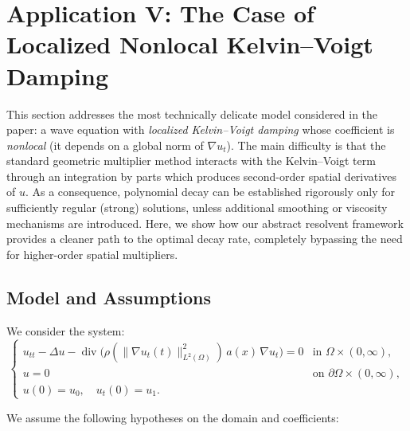 \documentclass[11pt,reqno]{amsart}
\theoremstyle{remark}
\begin{document}
\section{Application V: The Case of Localized Nonlocal Kelvin--Voigt Damping}
\label{sec:app_nonlocal_KV}

This section addresses the most technically delicate model considered in the paper:
a wave equation with \emph{localized Kelvin--Voigt damping} whose coefficient is
\emph{nonlocal} (it depends on a global norm of $\nabla u_t$). The main difficulty is
that the standard geometric multiplier method interacts with the Kelvin--Voigt term
through an integration by parts which produces second-order spatial derivatives of $u$.
As a consequence, polynomial decay can be established rigorously only for sufficiently
regular (strong) solutions, unless additional smoothing or viscosity mechanisms are introduced.
Here, we show how our abstract resolvent framework provides a cleaner path to the optimal decay rate, completely bypassing the need for higher-order spatial multipliers.

\subsection{Model and Assumptions}

We consider the system:
\begin{equation}\label{eq:KV_prob}
\begin{cases}
u_{tt}-\Delta u-\operatorname{div}\!\Big(\rho(\|\nabla u_t(t)\|_{L^2(\Omega)}^2)\,a(x)\,\nabla u_t\Big)=0
& \text{in }\Omega\times(0,\infty),\\
u=0 & \text{on }\partial\Omega\times(0,\infty),\\
u(0)=u_0,\quad u_t(0)=u_1.
\end{cases}
\end{equation}

We assume the following hypotheses on the domain and coefficients:
\end{document}
